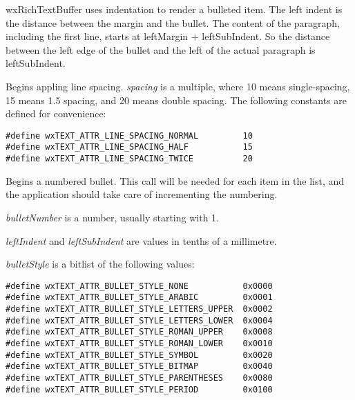 wxRichTextBuffer uses indentation to render a bulleted item. The left indent is the distance between
the margin and the bullet. The content of the paragraph, including the first line, starts
at leftMargin + leftSubIndent. So the distance between the left edge of the bullet and the
left of the actual paragraph is leftSubIndent.

\label{wxrichtextctrlbeginlinespacing}


Begins appling line spacing. {\it spacing} is a multiple, where 10 means single-spacing,
15 means 1.5 spacing, and 20 means double spacing. The following constants are
defined for convenience:

{\small
\begin{verbatim}
#define wxTEXT_ATTR_LINE_SPACING_NORMAL         10
#define wxTEXT_ATTR_LINE_SPACING_HALF           15
#define wxTEXT_ATTR_LINE_SPACING_TWICE          20
\end{verbatim}
}

\label{wxrichtextctrlbeginnumberedbullet}


Begins a numbered bullet. This call will be needed for each item in the list, and the
application should take care of incrementing the numbering.

{\it bulletNumber} is a number, usually starting with 1.

{\it leftIndent} and {\it leftSubIndent} are values in tenths of a millimetre.

{\it bulletStyle} is a bitlist of the following values:

{\small
\begin{verbatim}
#define wxTEXT_ATTR_BULLET_STYLE_NONE           0x0000
#define wxTEXT_ATTR_BULLET_STYLE_ARABIC         0x0001
#define wxTEXT_ATTR_BULLET_STYLE_LETTERS_UPPER  0x0002
#define wxTEXT_ATTR_BULLET_STYLE_LETTERS_LOWER  0x0004
#define wxTEXT_ATTR_BULLET_STYLE_ROMAN_UPPER    0x0008
#define wxTEXT_ATTR_BULLET_STYLE_ROMAN_LOWER    0x0010
#define wxTEXT_ATTR_BULLET_STYLE_SYMBOL         0x0020
#define wxTEXT_ATTR_BULLET_STYLE_BITMAP         0x0040
#define wxTEXT_ATTR_BULLET_STYLE_PARENTHESES    0x0080
#define wxTEXT_ATTR_BULLET_STYLE_PERIOD         0x0100
\end{verbatim}
}

